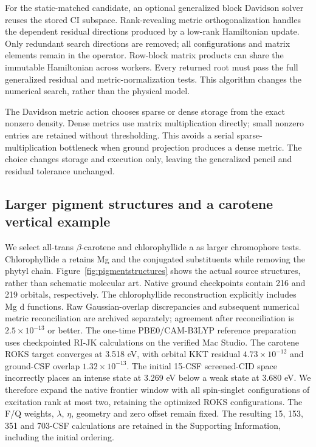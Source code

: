 \documentclass[11pt,a4paper]{article}
\begin{document}
For the static-matched candidate, an optional generalized block Davidson
solver reuses the stored CI subspace. Rank-revealing metric orthogonalization
handles the dependent residual directions produced by a low-rank Hamiltonian
update. Only redundant search directions are removed; all configurations
and matrix elements remain in the operator. Row-block matrix products can
share the immutable Hamiltonian across workers. Every returned root must
pass the full generalized residual and metric-normalization tests. This
algorithm changes the numerical search, rather than the physical model.

The Davidson metric action chooses sparse or dense storage from the exact
nonzero density. Dense metrics use matrix multiplication directly;
small nonzero entries are retained without thresholding. This avoids a
serial sparse-multiplication bottleneck when ground projection produces
a dense metric. The choice changes storage and execution only, leaving
the generalized pencil and residual tolerance unchanged.


\subsection{Larger pigment structures and a carotene vertical example}
We select all-trans $\beta$-carotene and chlorophyllide a as larger
chromophore tests. Chlorophyllide a retains Mg and the conjugated
substituents while removing the phytyl chain. Figure~\ref{fig:pigmentstructures}
shows the actual source structures, rather than schematic molecular art.
Native ground checkpoints contain 216 and 219 orbitals, respectively.
The chlorophyllide reconstruction explicitly includes Mg d functions.
Raw Gaussian-overlap discrepancies and subsequent numerical metric
reconciliation are archived separately; agreement after reconciliation is
$2.5\times10^{-13}$ or better. The one-time PBE0/CAM-B3LYP reference
preparation uses checkpointed RI-JK calculations on the verified Mac Studio.
The carotene ROKS target converges at 3.518 eV, with orbital KKT residual
$4.73\times10^{-12}$ and ground-CSF overlap $1.32\times10^{-13}$.
The initial 15-CSF screened-CID space incorrectly places an intense state
at 3.269 eV below a weak state at 3.680 eV. We therefore expand the native
frontier window with all spin-singlet configurations of excitation rank
at most two, retaining the optimized ROKS configurations. The F/Q weights,
$\lambda$, $\eta$, geometry and zero offset remain fixed. The resulting
15, 153, 351 and 703-CSF calculations are retained in the
Supporting Information, including the initial ordering.
\end{document}
